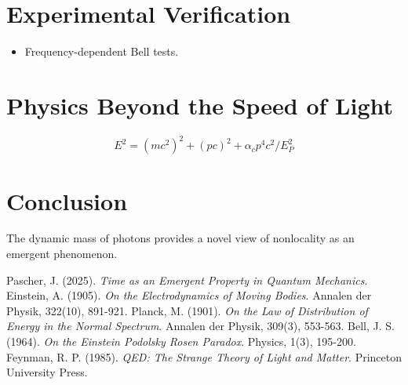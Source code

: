 \documentclass[12pt,a4paper]{article}
\begin{document}
	\section{Experimental Verification}
	\begin{itemize}
		\item Frequency-dependent Bell tests.
	\end{itemize}
	
	\section{Physics Beyond the Speed of Light}
	\begin{equation}
		E^2 = (mc^2)^2 + (pc)^2 + \alpha_c p^4 c^2 / E_P^2
	\end{equation}
	
	\section{Conclusion}
	The dynamic mass of photons provides a novel view of nonlocality as an emergent phenomenon.
	
	\begin{thebibliography}{5}
		 Pascher, J. (2025). \textit{Time as an Emergent Property in Quantum Mechanics}.
		 Einstein, A. (1905). \textit{On the Electrodynamics of Moving Bodies}. Annalen der Physik, 322(10), 891-921.
		 Planck, M. (1901). \textit{On the Law of Distribution of Energy in the Normal Spectrum}. Annalen der Physik, 309(3), 553-563.
		 Bell, J. S. (1964). \textit{On the Einstein Podolsky Rosen Paradox}. Physics, 1(3), 195-200.
		 Feynman, R. P. (1985). \textit{QED: The Strange Theory of Light and Matter}. Princeton University Press.
	\end{thebibliography}
	
\end{document}
